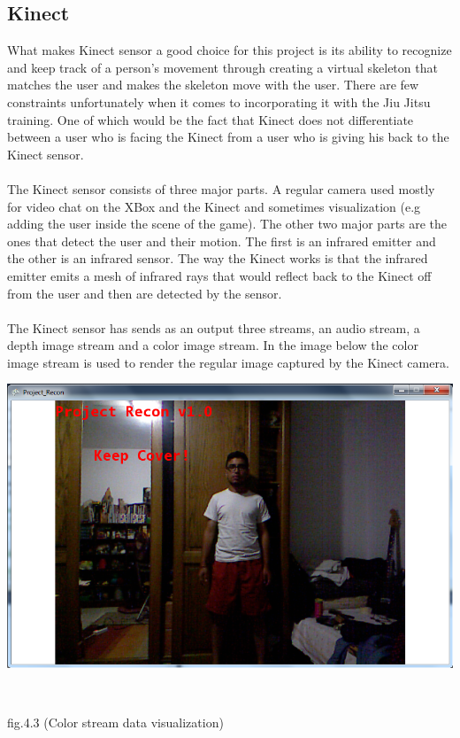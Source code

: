 \documentclass[11pt]{article} %
\begin{document}
\subsection{Kinect}
What makes Kinect sensor a good choice for this project is its ability to recognize and keep track of a person's movement through creating a virtual skeleton that matches the user and makes the skeleton move with the user. There are few constraints unfortunately when it comes to incorporating it with the Jiu Jitsu training. One of which would be the fact that Kinect does not differentiate between a user who is facing the Kinect from a user who is giving his back to the Kinect sensor.
\\
\\
The Kinect sensor consists of three major parts. A regular camera used mostly for video chat on the XBox and the Kinect and sometimes visualization (e.g adding the user inside the scene of the game). The other two major parts are the ones that detect the user and their motion. The first is an infrared emitter and the other is an infrared sensor. The way the Kinect works is that the infrared emitter emits a mesh of infrared rays that would reflect back to the Kinect off from the user and then are detected by the sensor.
\\
\\
The Kinect sensor has sends as an output three streams, an audio stream, a depth image stream and a color image stream. In the image below the color image stream is used to render the regular image captured by the Kinect camera.
\\
\centerline{\includegraphics[scale=0.5]{color_data.png}}
\\
\centerline{fig.4.3 (Color stream data visualization)}
\\
\end{document}
